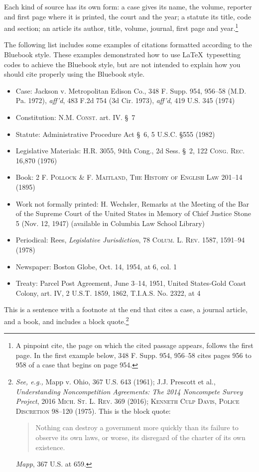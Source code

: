 \documentclass[letterpaper,12pt,twoside]{article}
\begin{document}
Each kind of source has its own form: a case gives its name, the volume, reporter and first page where it is printed, the court and the year; a statute its title, code and section; an article its author, title, volume, journal, first page and year.\footnote{A pinpoint cite, the page on which the cited passage appears, follows the first page. In the first example below, 348 F. Supp. 954, 956--58 cites pages 956 to 958 of a case that begins on page 954.\label{fn:pinpoint}}

The following list includes some examples of citations formatted according to the Bluebook style. These examples demonstrated how to use \LaTeX~typesetting codes to achieve the Bluebook style, but are not intended to explain how you should cite properly using the Bluebook style.

	\begin{itemize}
		\item Case: Jackson v. Metropolitan Edison Co., 348 F. Supp. 954, 956--58 (M.D. Pa. 1972), \emph{aff'd}, 483 F.2d 754 (3d Cir. 1973), \emph{aff'd}, 419 U.S. 345 (1974)
		\item Constitution: \textsc{N.M. Const.} art. IV. \S~7
		\item Statute: Administrative Procedure Act \S~6, 5 U.S.C. \S 555 (1982)
		\item Legislative Materials: H.R. 3055, 94th Cong., 2d Sess. \S~2, 122 \textsc{Cong. Rec.} 16,870 (1976)
		\item Book: 2 \textsc{F. Pollock \& F. Maitland, The History of English Law} 201--14 (1895)
		\item Work not formally printed: H. Wechsler, Remarks at the Meeting of the Bar of the Supreme Court of the United States in Memory of Chief Justice Stone 5 (Nov. 12, 1947) (available in Columbia Law School Library)
		\item Periodical: Rees, \emph{Legislative Jurisdiction}, 78 \textsc{Colum. L. Rev.} 1587, 1591--94 (1978)
		\item	Newspaper: Boston Globe, Oct. 14, 1954, at 6, col. 1
		\item Treaty: Parcel Post Agreement, June 3--14, 1951, United States-Gold Coast Colony, art. IV, 2 U.S.T. 1859, 1862, T.I.A.S. No. 2322, at 4
	\end{itemize}

This is a sentence with a footnote at the end that cites a case, a journal article, and a book, and includes a block quote.\footnote{\emph{See, e.g.,} Mapp v. Ohio, 367 U.S. 643 (1961); J.J. Prescott et al., \emph{Understanding Noncompetition Agreements: The 2014 Noncompete Survey Project}, 2016 \textsc{Mich. St. L. Rev.} 369 (2016); \textsc{Kenneth Culp Davis, Police Discretion 98--120 (1975)}. This is the block quote:
	\begin{quote}
		Nothing can destroy a government more quickly than its failure to observe its own laws, or worse, its disregard of the charter of its own existence.
	\end{quote}
	\emph{Mapp}, 367 U.S. at 659.}
\end{document}
